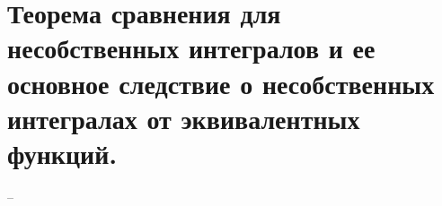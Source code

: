 \section{Теорема сравнения для несобственных интегралов и ее основное следствие о несобственных интегралах от эквивалентных функций.}
--
\newline